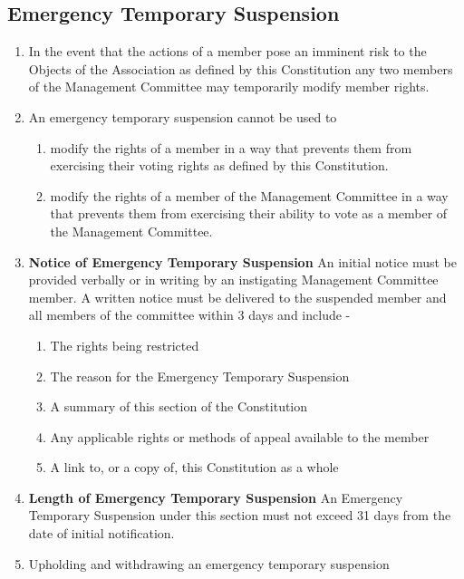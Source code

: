 \documentclass[../constitution.tex]{subfiles}
\begin{document}
\hypertarget{emergency-temporary-suspension}{%
\subsection*{Emergency Temporary Suspension}\label{emergency-temporary-suspension}}


\begin{enumerate}

\item In the event that the actions of a member pose an imminent risk to the Objects of the Association as defined by this Constitution any two members of the Management Committee may temporarily modify member rights.
\item An emergency temporary suspension cannot be used to

  \begin{enumerate}
  
  \item modify the rights of a member in a way that prevents them from exercising their voting rights as defined by this Constitution.
  \item modify the rights of a member of the Management Committee in a way that prevents them from exercising their ability to vote as a member of the Management Committee.
  \end{enumerate}
\item \textbf{Notice of Emergency Temporary Suspension} An initial notice must be provided verbally or in writing by an instigating Management Committee member. A written notice must be delivered to the suspended member and all members of the committee within 3 days and include -

  \begin{enumerate}
  
  \item The rights being restricted\\
  \item The reason for the Emergency Temporary Suspension\\
  \item A summary of this section of the Constitution\\
  \item Any applicable rights or methods of appeal available to the member
  \item A link to, or a copy of, this Constitution as a whole\\
  \end{enumerate}
\item \textbf{Length of Emergency Temporary Suspension} An Emergency Temporary Suspension under this section must not exceed 31 days from the date of initial notification.\\
\item Upholding and withdrawing an emergency temporary suspension


\end{enumerate}
\end{document}
